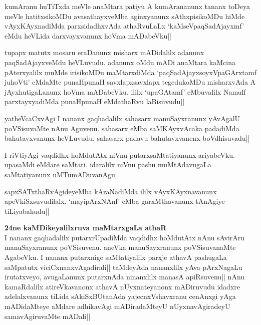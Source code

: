 \stext


\begin{artha}
kumAranu huTiTxda meVle anaMtara patiyu A kumArananunx tananx toDeya 
meVle hatitxsikoMDu avasathayxveMba aginxyanunx sAthxpisikoMDu hiMde 
vAyxKAyxnadiMda parxsidadhxvAda athaRvuLaLx `kaMseVpaqSadAjayxmf' eMdu 
heVLida darxvayxvanunx hoVma mADabeVku||
\end{artha}


\begin{artha}
tupapx matutx mosaru eraDanunx misharx mADidalilx adanunx 
paqSadAjayxveMdu heVLuvudu. adanunx oMdu mADi anaMtara kaMcina 
pAterxyalilx muMde irisikoMDu maMtarxdiMda `paqSadAjayxsoyxVpaGArxtamf 
juhoVti' eMdaMte punaHpunaH savxlapxsavxlapx tegedukoMDu misharxvAda A 
jAyxhutigaLanunx hoVma mADabeVku. ililx `upaGAtamf' eMbuvalilx Namulf 
parxtayxyadiMda punaHpunaH eMdathaRvu laBisuvudu||
\end{artha}

\begin{artha}
yatheVcaCxvAgi I nananx gaqhadalilx sahasarx manuSayxranunx yAvAgalU 
poVSisuvaMte nAnu Aguvenu. sahasarx eMba saMKAyxvAcaka padadiMda 
bahutavxvanunx heVLuvudu. sahasarx padavu bahutavxvanenx boVdhisuvadu||
\end{artha}

\begin{artha}
I riVtiyAgi vaqdidhx hoMdutAtx niVnu putarxsaMtatiyanunx ariyabeVku. 
upasaMdi eMdare saMtati. idaralilx niVnu pashu muMtAdavugaLa 
saMtatiyanunx uMTumADuvanAgu||
\end{artha}


\begin{artha}
sapxSATxthaRvAgideyeMba kAraNadiMda ililx vAyxKAyxnavanunx 
apeVkiSxsuvudilalx. `mayipArxNAnf' eMba garxMthavanunx tAnAgiye 
tiLiyabahudu||
\end{artha}

\textbf{24ne kaMDikeyalilxruva maMtarxgaLa athaR}\\
I nananx gaqhadalilx putarxrUpadiMda vaqdidhx hoMdutAtx nAnu sAvirAru 
manuSayxranunx poVSisuvenu. aneVka manuSayxranunx poVSisuvanaMte 
AgabeVku. I nananx putarxnige saMtatiyalilx parxje athavA pashugaLa 
saMpatutx viciCxnanxvAgadirali|| taMdeyAda nananxlilx yAva pArxNagaLu 
irutatxveyo, avugaLanunx putarxnAda ninanxlilx manasA apiRsuvenu|| 
nAnu kamaRdalilx atireVkavanonx athavA nUyxnateyanonx mADiruvudu 
idadxre adelalxvanunx tiLida sAkiSxBUtanAda yajecnxVshavxranu cenAnxgi 
yAga mADidaMteye aMdare adhikavAgi mADiradaMteyU nUyxnavAgiradeyU 
samavAgiruvaMte mADali||

